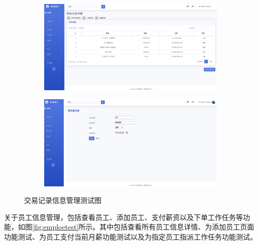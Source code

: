 \begin{figure}[H]
    \centering
    \begin{subfigure}{.45\textwidth}
        \centering
        \includegraphics[width=\textwidth]{figures/6viewalltransc.png}
    \end{subfigure}
    \qquad
    \begin{subfigure}{.45\textwidth}
        \centering
        \includegraphics[width=\textwidth]{figures/6addnewtransc.png}
    \end{subfigure}
    \caption{交易记录信息管理测试图}
    \label{fig:tscttf}
\end{figure}

关于员工信息管理，包括查看员工、添加员工、支付薪资以及下单工作任务等功能，如图\ref{fig:emploetest}所示。其中包括查看所有员工信息详情、为添加员工页面功能测试、为员工支付当前月薪功能测试以及为指定员工指派工作任务功能测试。

